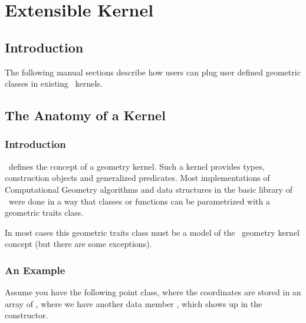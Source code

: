 \chapter{Extensible Kernel}

\section{Introduction}

The following manual sections describe how users can plug user defined
geometric classes in existing \cgal\ kernels.

\section{The Anatomy of a Kernel}

\subsection{Introduction}

\cgal\ defines the concept of a geometry kernel. Such a kernel provides types,
construction objects and generalized predicates. Most implementations
of Computational Geometry algorithms and data structures in the basic
library of \cgal\ were done in a way that classes or functions can be
parametrized with a geometric traits class.

In most cases this geometric traits class must be a model of the \cgal\ geometry
kernel concept (but there are some exceptions).



\subsection{An Example}

Assume you have the following point class, where the coordinates are
stored in an array of , where we have another data member
, which shows up in the constructor.


